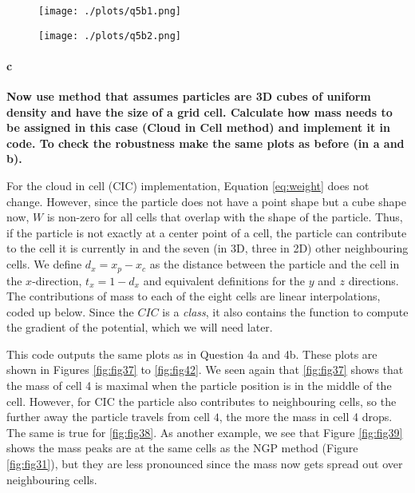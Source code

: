 \begin{figure}[ht]\centering
\begin{minipage}[t]{.5\textwidth}
\centering
\texttt{[image: ./plots/q5b1.png]}
\captionsetup{width=0.8\linewidth}
\label{fig:fig35}
\end{minipage}%
\begin{minipage}[t]{.5\textwidth}
\centering
\texttt{[image: ./plots/q5b2.png]}
\captionsetup{width=0.8\linewidth}
\label{fig:fig36}
\end{minipage}%
\end{figure}


\paragraph{c} \textbf{Now use method that assumes particles are 3D cubes of uniform density and have the size of a grid cell. Calculate how mass needs to be assigned in this case (Cloud in Cell method) and implement it in code. To check the robustness make the same plots as before (in a and b).}

For the cloud in cell (CIC) implementation, Equation \ref{eq:weight} does not change. However, since the particle does not have a point shape but a cube shape now, $W$ is non-zero for all cells that overlap with the shape of the particle. Thus, if the particle is not exactly at a center point of a cell, the particle can contribute to the cell it is currently in and the seven (in 3D, three in 2D) other neighbouring cells. We define $d_x = x_p - x_c$ as the distance between the particle and the cell in the $x$-direction, $t_x = 1-d_x$ and equivalent definitions for the $y$ and $z$ directions. The contributions of mass to each of the eight cells are linear interpolations, coded up below. Since the $CIC$ is a \textit{class}, it also contains the function to compute the gradient of the potential, which we will need later.




This code outputs the same plots as in Question 4a and 4b. These plots are shown in Figures \ref{fig:fig37} to \ref{fig:fig42}. We seen again that \ref{fig:fig37} shows that the mass of cell 4 is maximal when the particle position is in the middle of the cell. However, for CIC the particle also contributes to neighbouring cells, so the further away the particle travels from cell $4$, the more the mass in cell 4 drops. The same is true for \ref{fig:fig38}. As another example, we see that Figure \ref{fig:fig39} shows the mass peaks are at the same cells as the NGP method (Figure \ref{fig:fig31}), but they are less pronounced since the mass now gets spread out over neighbouring cells.


